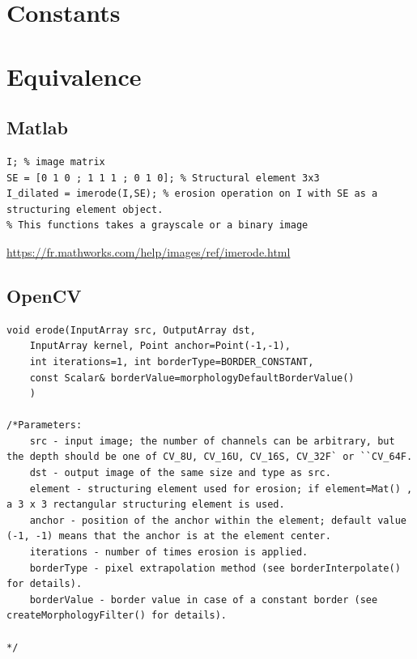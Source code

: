 \documentclass[12pt,a4paper]{article}
\begin{document}
\vspace{0.5cm}

\section*{Constants}




\section*{Equivalence}
\subsection*{Matlab}

\lstset{language=Matlab}
\begin{lstlisting}
I; % image matrix
SE = [0 1 0 ; 1 1 1 ; 0 1 0]; % Structural element 3x3
I_dilated = imerode(I,SE); % erosion operation on I with SE as a structuring element object.
% This functions takes a grayscale or a binary image

\end{lstlisting}

\url{https://fr.mathworks.com/help/images/ref/imerode.html}


\subsection*{OpenCV}

\lstset{language=C++}
\begin{lstlisting}
void erode(InputArray src, OutputArray dst, 
	InputArray kernel, Point anchor=Point(-1,-1), 
	int iterations=1, int borderType=BORDER_CONSTANT, 
	const Scalar& borderValue=morphologyDefaultBorderValue() 
	)

/*Parameters:	
    src - input image; the number of channels can be arbitrary, but the depth should be one of CV_8U, CV_16U, CV_16S, CV_32F` or ``CV_64F.
    dst - output image of the same size and type as src.
    element - structuring element used for erosion; if element=Mat() , a 3 x 3 rectangular structuring element is used.
    anchor - position of the anchor within the element; default value (-1, -1) means that the anchor is at the element center.
    iterations - number of times erosion is applied.
    borderType - pixel extrapolation method (see borderInterpolate() for details).
    borderValue - border value in case of a constant border (see createMorphologyFilter() for details).

*/
\end{lstlisting}
\end{document}
